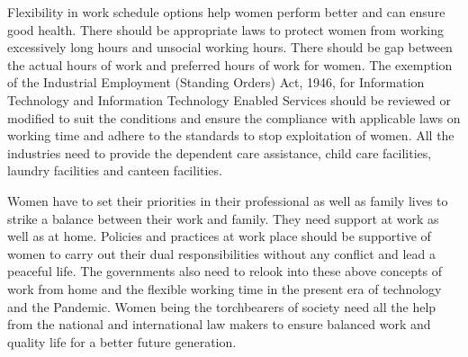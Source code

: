 \begin{multicols}{2}
\noi
Flexibility in work schedule options help women perform better and can ensure good health.
There should be appropriate laws to protect women from working excessively long hours and
unsocial working hours. There should be gap between the actual hours of work and preferred
hours of work for women. The exemption of the Industrial Employment (Standing Orders)
Act, 1946, for Information Technology and Information Technology Enabled Services should
be reviewed or modified to suit the conditions and ensure the compliance with applicable
laws on working time and adhere to the standards to stop exploitation of women. All the industries need to provide the dependent care assistance, child care facilities, laundry facilities and canteen facilities. 

\noi
Women have to set their priorities in their professional as well as family lives to strike a
balance between their work and family. They need support at work as well as at home.
Policies and practices at work place should be supportive of women to carry out their dual
responsibilities without any conflict and lead a peaceful life. The governments also need to
relook into these above concepts of work from home and the flexible working time in the
present era of technology and the Pandemic. Women being the torchbearers of society need
all the help from the national and international law makers to ensure balanced work and
quality life for a better future generation.

\end{multicols}
